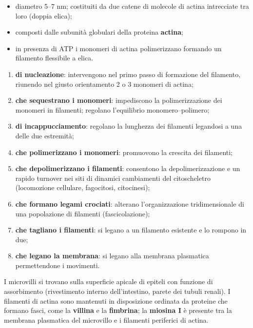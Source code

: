 \begin{itemize}
  \item diametro 5--7 nm; costituiti da due catene di molecole di actina intrecciate tra loro (doppia elica);
  \item composti dalle subunità globulari della proteina \textbf{actina};
  \item in presenza di ATP i monomeri di actina polimerizzano formando un filamento flessibile a elica.
\end{itemize}

\begin{enumerate}
  \item \textbf{di nucleazione}: intervengono nel primo passo di formazione del filamento, riunendo nel giusto orientamento 2 o 3 monomeri di actina;
  \item \textbf{che sequestrano i monomeri}: impediscono la polimerizzazione dei monomeri in filamenti; regolano l'equilibrio monomero--polimero;
  \item \textbf{di incappucciamento}: regolano la lunghezza dei filamenti legandosi a una delle due estremità;
  \item \textbf{che polimerizzano i monomeri}: promuovono la crescita dei filamenti;
  \item \textbf{che depolimerizzano i filamenti}: consentono la depolimerizzazione e un rapido turnover nei siti di dinamici cambiamenti del citoscheletro (locomozione cellulare, fagocitosi, citocinesi);
  \item \textbf{che formano legami crociati}: alterano l'organizzazione tridimensionale di una popolazione di filamenti (fascicolazione);
  \item \textbf{che tagliano i filamenti}: si legano a un filamento esistente e lo rompono in due;
  \item \textbf{che legano la membrana}: si legano alla membrana plasmatica permettendone i movimenti.
\end{enumerate}

I microvilli si trovano sulla superficie apicale di epiteli con funzione di assorbimento (rivestimento interno dell'intestino, parete dei tubuli renali). I filamenti di actina sono mantenuti in disposizione ordinata da proteine che formano fasci, come la \textbf{villina} e la \textbf{fimbrina}; la \textbf{miosina I} è presente tra la membrana plasmatica del microvillo e i filamenti periferici di actina.

